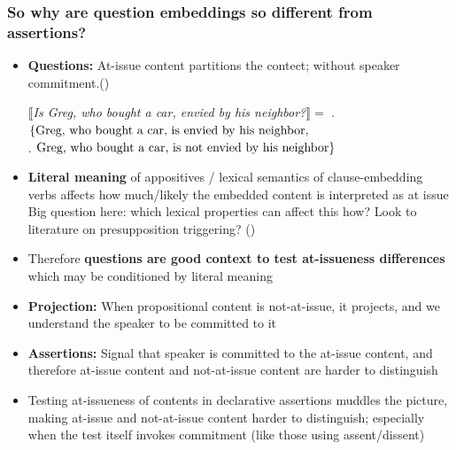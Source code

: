 \documentclass[compress, xcolor = dvipsnames, aspectratio=169]{beamer}
\begin{document}
	\begin{frame}[t]\frametitle{So why are question embeddings so different from assertions?}\scriptsize 
		\begin{itemize}[<+->]
			\item \textbf{Questions:} At-issue content partitions the contect; without speaker commitment\newline \phantom.\hfill {\scriptsize(\citealt{groenendijk_studies_1984,ginzburg_interrogatives_1996,roberts_information_1996,tonhauser_how_2018})}\smallskip

			$\llbracket$\emph{Is Greg, who bought a car, envied by his neighbor?}$\rrbracket =$
			\phantom. \hfill $\{\textnormal{Greg, who bought a car, is envied by his neighbor},$\\
			\phantom. \hfill$\textnormal{Greg, who bought a car, is not envied by his neighbor}\}$\medskip

			\item \textbf{Literal meaning} of appositives / lexical semantics of clause-embedding verbs affects how much/likely the embedded content is interpreted as at issue\smallskip\\ 
			{\scriptsize Big question here: which lexical properties can affect this how? Look to literature on presupposition triggering? (\citealt{abrusan_predicting_2011,schlenker_triggering_2021,anand_facts_2024,scontras_projection_2025})}\medskip

			\item Therefore \textbf{questions are good context to test at-issueness differences} which may be conditioned by literal meaning\medskip

			\item \textbf{Projection:} When propositional content is not-at-issue, it projects, and we understand the speaker to be committed to it\medskip

			\item \textbf{Assertions:} Signal that speaker is committed to the at-issue content, and therefore at-issue content and not-at-issue content are harder to distinguish\medskip

			\item Testing at-issueness of contents in declarative assertions muddles the picture, making at-issue and not-at-issue content harder to distinguish; especially when the test itself invokes commitment (like those using assent/dissent)

		\end{itemize}
	
	\end{frame}
	
\end{document}
